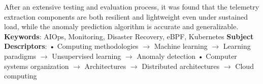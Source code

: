 After an extensive testing and evaluation process, it was found that the telemetry extraction components are both resilient and lightweight even under sustained load, while the anomaly prediction algorithm is accurate and generalizable. 
\newline
\newline
\textbf{Keywords}:
AIOps, Monitoring, Disaster Recovery, eBPF, Kubernetes
\newline
\textbf{Subject Descriptors}:
• Computing methodologies $\rightarrow$ Machine learning $\rightarrow$ Learning paradigms $\rightarrow$ Unsupervised learning $\rightarrow$ Anomaly detection • Computer systems organization $\rightarrow$ Architectures $\rightarrow$ Distributed architectures $\rightarrow$ Cloud computing
